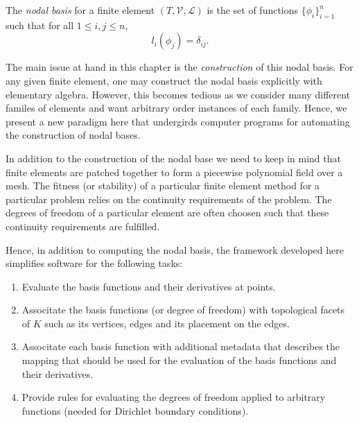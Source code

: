 

\begin{definition}
The \emph{nodal basis} for a finite element \( (T,\mathcal{V},\mathcal{L}) \) 
is the set of functions \( \{ \phi_i \}_{i=1}^{n} \) such
that for all \( 1 \leq i,j \leq n \),
\begin{equation}
l_i(\phi_j) = \delta_{ij}.
\end{equation}
\label{chap:kirby-1:nodaldef}
\end{definition}

The main issue at hand in this chapter is the \emph{construction} of
this nodal basis.  For
any given finite element, one may construct the nodal basis
explicitly with elementary algebra.  However, this becomes tedious as
we consider many different familes of elements and want arbitrary
order instances of each family.  Hence, we present a new 
paradigm here that undergirds computer programs for automating the
construction of nodal bases.

In addition to the construction of the nodal base we need to keep in mind that
finite elements are patched together to form a piecewise
polynomial field over a mesh. The fitness (or stability) of a particular finite element method for a particular problem relies on the continuity
requirements of the problem. The degrees of freedom of a particular element
are often choosen such that these continuity requirements are fulfilled.

Hence, in addition to computing the nodal basis, the framework developed here
simplifies software for the following tasks:

\begin{enumerate}
\item Evaluate the basis functions and their derivatives at points.
\item Associtate the basis functions (or degree of freedom) with
      topological facets of \( K \) such as its vertices, edges and its
      placement on the edges.
\item Associtate each basis function with additional metadata that describes  
      the mapping that should be used for the evaluation of the basis functions and their derivatives.
\item Provide rules for evaluating the degrees of freedom applied to arbitrary functions 
      (needed for Dirichlet boundary conditions).
\end{enumerate}


